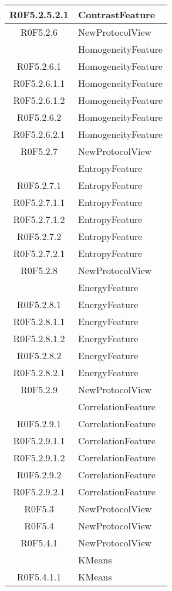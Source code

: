 \begin{center}
\begin{longtable}{|c|l|}
\hline
R0F5.2.5.2.1 & ContrastFeature \\ 
\hline
R0F5.2.6 & NewProtocolView \\ 
 & HomogeneityFeature \\ 
\hline
R0F5.2.6.1 & HomogeneityFeature \\ 
\hline
R0F5.2.6.1.1 & HomogeneityFeature \\ 
\hline
R0F5.2.6.1.2 & HomogeneityFeature \\ 
\hline
R0F5.2.6.2 & HomogeneityFeature \\ 
\hline
R0F5.2.6.2.1 & HomogeneityFeature \\ 
\hline
R0F5.2.7 & NewProtocolView \\ 
 & EntropyFeature \\ 
\hline
R0F5.2.7.1 & EntropyFeature \\ 
\hline
R0F5.2.7.1.1 & EntropyFeature \\ 
\hline
R0F5.2.7.1.2 & EntropyFeature \\ 
\hline
R0F5.2.7.2 & EntropyFeature \\ 
\hline
R0F5.2.7.2.1 & EntropyFeature \\ 
\hline
R0F5.2.8 & NewProtocolView \\ 
 & EnergyFeature \\ 
\hline
R0F5.2.8.1 & EnergyFeature \\ 
\hline
R0F5.2.8.1.1 & EnergyFeature \\ 
\hline
R0F5.2.8.1.2 & EnergyFeature \\ 
\hline
R0F5.2.8.2 & EnergyFeature \\ 
\hline
R0F5.2.8.2.1 & EnergyFeature \\ 
\hline
R0F5.2.9 & NewProtocolView \\ 
 & CorrelationFeature \\ 
\hline
R0F5.2.9.1 & CorrelationFeature \\ 
\hline
R0F5.2.9.1.1 & CorrelationFeature \\ 
\hline
R0F5.2.9.1.2 & CorrelationFeature \\ 
\hline
R0F5.2.9.2 & CorrelationFeature \\ 
\hline
R0F5.2.9.2.1 & CorrelationFeature \\ 
\hline
R0F5.3 & NewProtocolView \\ 
\hline
R0F5.4 & NewProtocolView \\ 
\hline
R0F5.4.1 & NewProtocolView \\ 
 & KMeans \\ 
\hline
R0F5.4.1.1 & KMeans \\ 

\end{longtable}
\end{center}
